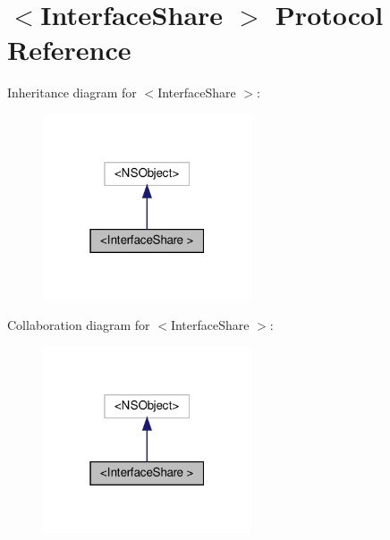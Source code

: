 \hypertarget{protocolInterfaceShare_01-p}{}\section{$<$Interface\+Share $>$ Protocol Reference}
\label{protocolInterfaceShare_01-p}


Inheritance diagram for $<$Interface\+Share $>$\+:
\nopagebreak
\begin{figure}[H]
\begin{center}
\leavevmode
\includegraphics[width=175pt]{protocolInterfaceShare_01-p__inherit__graph}
\end{center}
\end{figure}


Collaboration diagram for $<$Interface\+Share $>$\+:
\nopagebreak
\begin{figure}[H]
\begin{center}
\leavevmode
\includegraphics[width=175pt]{protocolInterfaceShare_01-p__coll__graph}
\end{center}
\end{figure}

